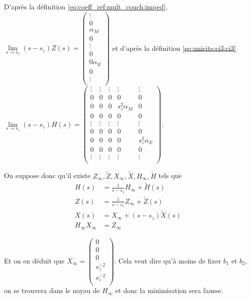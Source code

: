 D'après la définition \eqref{eq:coeff_ref:mult_couch:imped}, $\lim\limits_{s\rightarrow s_z} (s-s_z) Z(s) 
= \begin{pmatrix}
  \vdots \\
  0\\
  \alpha_{M}\\
  0 \\
  \vdots\\
  0 \\
  0 \alpha_{E} \\
  0 \\
  \vdots \\
\end{pmatrix}$ et d'après la définition \eqref{eq:unicite:ci3:ci3} $\lim\limits_{s\rightarrow s_z} (s-s_z)H(s) =
\begin{pmatrix}
  \vdots & \vdots & \vdots & \vdots &\vdots \\
  0 & 0 & 0 & 0 & 0 \\
  0 & 0 & 0 & s_z^2 \alpha_{M} & 0 \\
  0 & 0 & 0 & 0 & 0 \\
  \vdots & \vdots & \vdots & \vdots &\vdots \\
  0 & 0 & 0 & 0 & 0 \\
  0 & 0 & 0 & 0 & s_z^2 \alpha_{E} \\
  0 & 0 & 0 & 0 & 0 \\
  \vdots & \vdots & \vdots & \vdots &\vdots \\
\end{pmatrix}$.


On suppose donc qu'il existe $Z_\infty, \tilde{Z},X_\infty, \tilde{X},H_\infty, \tilde{H}$ tels que
\begin{align*}
H(s) &= \frac{1}{s-s_z}H_\infty + \tilde{H}(s) \\
Z(s) &= \frac{1}{s-s_z}Z_\infty + \tilde{Z}(s) \\
X(s) &= X_\infty + (s-s_z)\tilde{X}(s) \\
H_\infty X_\infty &= Z_\infty
\end{align*}

Et on en déduit que $X_\infty = \begin{pmatrix}
  0\\
  0\\
  0\\
  s_z^{-2}\\
  s_z^{-2}\\
  \end{pmatrix}$. Cela veut dire qu'à moins de fixer $b_1$ et $b_2$, on se trouvera dans le noyau de $H_\infty$ et donc la minimisation sera fausse.

